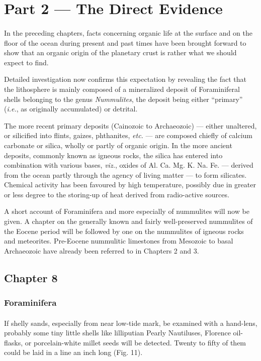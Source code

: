 \documentclass[a4paper, 12pt, oneside]{article}
\begin{document}
\section{Part 2 --- The Direct Evidence}
\paragraph{}
In the preceding chapters, facts concerning organic life at the surface and on the floor of the ocean during present and past times have been brought forward to show that an organic origin of the planetary crust is rather what we should expect to find.

Detailed investigation now confirms this expectation by revealing the fact that the lithosphere is mainly composed of a mineralized deposit of Foraminiferal shells belonging to the genus \emph{Nummulites}, the deposit being either ``primary'' (\emph{i.e.}, as originally accumulated) or detrital.

The more recent primary deposits (Cainozoic to Archaeozoic) --- either unaltered, or silicified into flints, gaizes, phthanites, \emph{etc.} --- are composed chiefly of calcium carbonate or silica, wholly or partly of organic origin. In the more ancient deposits, commonly known as igneous rocks, the silica has entered into combination with various bases, \emph{viz.}, oxides of Al. Ca. Mg. K. Na. Fe. --- derived from the ocean partly through the agency of living matter --- to form silicates. Chemical activity has been favoured by high temperature, possibly due in greater or less degree to the storing-up of heat derived from radio-active sources.

A short account of Foraminifera and more especially of nummulites will now be given. A chapter on the generally known and fairly well-preserved nummulites of the Eocene period will be followed by one on the nummulites of igneous rocks and meteorites. Pre-Eocene nummulitic limestones from Mesozoic to basal Archaeozoic have already been referred to in Chapters 2 and 3.
\clearpage
\subsection{Chapter 8}
\subsubsection{Foraminifera}
\paragraph{}
If shelly sands, especially from near low-tide mark, be examined with a hand-lens, probably some tiny little shells like lilliputian Pearly Nautiluses, Florence oil-flasks, or porcelain-white millet seeds will be detected. Twenty to fifty of them could be laid in a line an inch long (Fig. 11).
\end{document}
